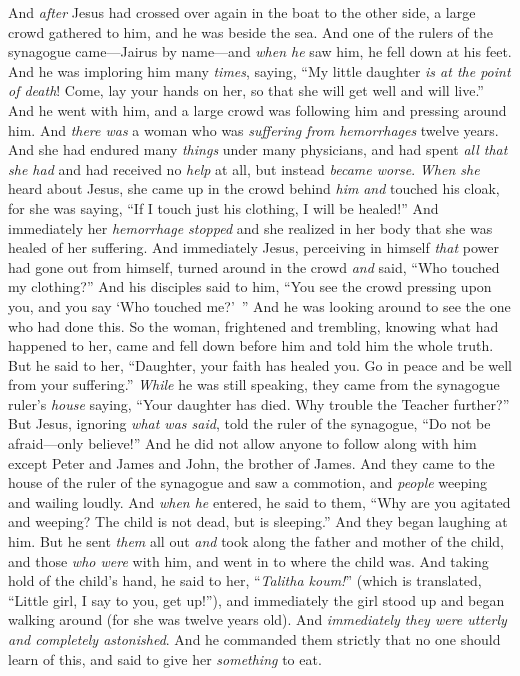 \begin{biblechapter}
 And \textit{after} Jesus had crossed over again in the boat to the other side, a large crowd gathered to him, and he was beside the sea.
\verse And one of the rulers of the synagogue came—Jairus by name—and \textit{when he} saw him, he fell down at his feet.
\verse And he was imploring him many \textit{times}, saying, “My little daughter \textit{is at the point of death}! Come, lay your hands on her, so that she will get well and will live.”
\verse And he went with him, and a large crowd was following him and pressing around him.
\verse And \textit{there was} a woman who was \textit{suffering from hemorrhages} twelve years.
\verse And she had endured many \textit{things} under many physicians, and had spent \textit{all that she had} and had received no \textit{help} at all, but instead \textit{became worse}.
\verse \textit{When she} heard about Jesus, she came up in the crowd behind \textit{him} \textit{and} touched his cloak,
\verse for she was saying, “If I touch just his clothing, I will be healed!”
\verse And immediately her \textit{hemorrhage stopped} and she realized in her body that she was healed of her suffering.
\verse And immediately Jesus, perceiving in himself \textit{that} power had gone out from himself, turned around in the crowd \textit{and} said, “Who touched my clothing?”
\verse And his disciples said to him, “You see the crowd pressing upon you, and you say ‘Who touched me?’ ”
\verse And he was looking around to see the one who had done this.
\verse So the woman, frightened and trembling, knowing what had happened to her, came and fell down before him and told him the whole truth.
\verse But he said to her, “Daughter, your faith has healed you. Go in peace and be well from your suffering.”
\verse \textit{While} he was still speaking, they came from the synagogue ruler’s \textit{house} saying, “Your daughter has died. Why trouble the Teacher further?”
\verse But Jesus, ignoring \textit{what was said}, told the ruler of the synagogue, “Do not be afraid—only believe!”
\verse And he did not allow anyone to follow along with him except Peter and James and John, the brother of James.
\verse And they came to the house of the ruler of the synagogue and saw a commotion, and \textit{people} weeping and wailing loudly.
\verse And \textit{when he} entered, he said to them, “Why are you agitated and weeping? The child is not dead, but is sleeping.”
\verse And they began laughing at him. But he sent \textit{them} all out \textit{and} took along the father and mother of the child, and those \textit{who were} with him, and went in to where the child was.
\verse And taking hold of the child’s hand, he said to her, “\textit{Talitha koum!}” (which is translated, “Little girl, I say to you, get up!”),
\verse and immediately the girl stood up and began walking around (for she was twelve years old). And \textit{immediately they were utterly and completely astonished}.
\verse And he commanded them strictly that no one should learn of this, and said to give her \textit{something} to eat.
\end{biblechapter}

